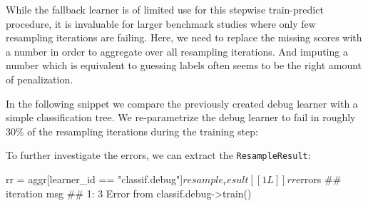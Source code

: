 \documentclass[
  11pt,
  parskip=half,
  DIV=calc,
  BCOR=10mm,
  x11names]{scrbook}
\newenvironment{Shaded}{}{}
\newcommand{\DataTypeTok}[1]{#1}
\newcommand{\FloatTok}[1]{#1}
\newcommand{\KeywordTok}[1]{\textcolor[rgb]{0.00,0.00,1.00}{#1}}
\newcommand{\NormalTok}[1]{#1}
\newcommand{\OperatorTok}[1]{#1}
\newcommand{\OtherTok}[1]{\textcolor[rgb]{1.00,0.25,0.00}{#1}}
\newcommand{\StringTok}[1]{\textcolor[rgb]{0.00,0.50,0.50}{#1}}
\begin{document}
While the fallback learner is of limited use for this stepwise train-predict procedure, it is invaluable for larger benchmark studies where only few resampling iterations are failing.
Here, we need to replace the missing scores with a number in order to aggregate over all resampling iterations.
And imputing a number which is equivalent to guessing labels often seems to be the right amount of penalization.

In the following snippet we compare the previously created debug learner with a simple classification tree.
We re-parametrize the debug learner to fail in roughly 30\% of the resampling iterations during the training step:

\begin{Shaded}
\end{Shaded}

To further investigate the errors, we can extract the \texttt{ResampleResult}:

\begin{Shaded}
\begin{Highlighting}[]
\NormalTok{rr =}\StringTok{ }\NormalTok{aggr[learner_id }\OperatorTok{==}\StringTok{ "classif.debug"}\NormalTok{]}\OperatorTok{$}\NormalTok{resample_result[[1L]]}
\NormalTok{rr}\OperatorTok{$}\NormalTok{errors}
\NormalTok{##    iteration                               msg}
\NormalTok{## 1:         3 Error from classif.debug->train()}
\end{Highlighting}
\end{Shaded}
\end{document}
